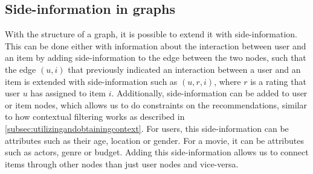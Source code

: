 \subsection{Side-information in graphs}
With the structure of a graph, it is possible to extend it with side-information.
This can be done either with information about the interaction between user and an item by adding side-information to the edge between the two nodes, such that the edge $(u, i)$ that previously indicated an interaction between a user and an item is extended with side-information such as $(u, r, i)$, where $r$ is a rating that user $u$ has assigned to item $i$\cite{aggarwal2016recommender}. 
Additionally, side-information can be added to user or item nodes, which allows us to do constraints on the recommendations, similar to how contextual filtering works as described in \autoref{subsec:utilizingandobtainingcontext}.
For users, this side-information can be attributes such as their age, location or gender.
For a movie, it can be attributes such as actors, genre or budget.
Adding this side-information allows us to connect items through other nodes than just user nodes and vice-versa.
